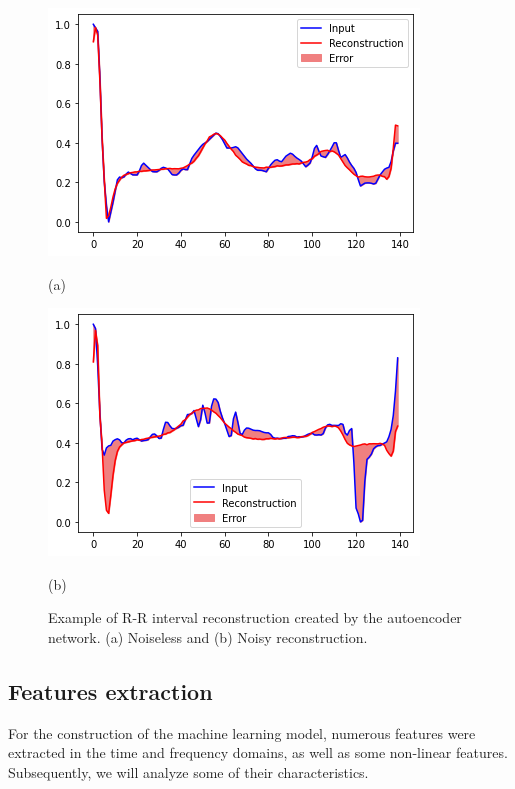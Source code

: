 \begin{figure}[t!]
    \begin{minipage}[b]{.48\linewidth}
        \centering
        \centerline{\includegraphics[scale=0.31]{autoenc_good.png}}
        \centerline{(a)}\medskip
    \end{minipage}
    \begin{minipage}[b]{0.48\linewidth}
        \centering
        \centerline{\includegraphics[scale=0.31]{autoenc_bad.png}}
        \centerline{(b)}\medskip
    \end{minipage}
%
\caption{Example of R-R interval reconstruction created by the autoencoder network. (a) Noiseless and (b) Noisy reconstruction.}
\label{fig:res}
%
\end{figure}
%
\subsection{Features extraction}
\label{ssec:features_extraction}
For the construction of the machine learning model, numerous features were extracted in the time and frequency domains, as well as some non-linear features. Subsequently, we will analyze some of their characteristics.
%
